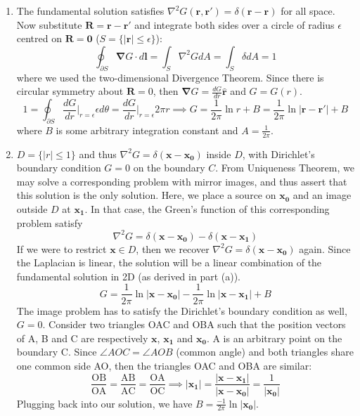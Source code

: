 \documentclass[a4paper]{article}
\begin{document}
\begin{ans}\leavevmode
\begin{enumerate}[label=(\alph*)]
\item The fundamental solution satisfies $\nabla^2G(\mathbf{r},\mathbf{r'})=\delta(\mathbf{r}-\mathbf{r})$ for all space. Now substitute $\mathbf{R}=\mathbf{r}-\mathbf{r'}$ and integrate both sides over a circle of radius $\epsilon$ centred on $\mathbf{R}=\boldsymbol{0}$ ($S=\{|\mathbf{r}|\leq\epsilon\}$):
$$\oint_{\partial S}\boldsymbol{\nabla}G\cdot d\mathbf{l}=\int_S\nabla^2GdA=\int_S\delta dA=1$$
where we used the two-dimensional Divergence Theorem. Since there is circular symmetry about $\mathbf{R}=0$, then $\boldsymbol{\nabla}G=\frac{dG}{dr}\mathbf{\hat{r}}$ and $G=G(r)$.
$$1=\oint_{\partial S}\frac{dG}{dr}\bigg|_{r=\epsilon}\epsilon d\theta=\frac{dG}{dr}\bigg|_{r=\epsilon}2\pi r\implies G=\frac{1}{2\pi}\ln r+B=\frac{1}{2\pi}\ln|\mathbf{r}-\mathbf{r'}|+B$$
where $B$ is some arbitrary integration constant and $A=\frac{1}{2\pi}$.
\item $D=\{|r|\leq 1\}$ and thus $\nabla^2G=\delta(\mathbf{x}-\mathbf{x_0})$ inside $D$, with Dirichlet's boundary condition $G=0$ on the boundary $C$. From Uniqueness Theorem, we may solve a corresponding problem with mirror images, and thus assert that this solution is the only solution. Here, we place a source on $\mathbf{x_0}$ and an image outside $D$ at $\mathbf{x_1}$. In that case, the Green's function of this corresponding problem satisfy
$$\nabla^2G=\delta(\mathbf{x}-\mathbf{x_0})-\delta(\mathbf{x}-\mathbf{x_1})$$
If we were to restrict $\mathbf{x}\in D$, then we recover $\nabla^2G=\delta(\mathbf{x}-\mathbf{x_0})$ again. Since the Laplacian is linear, the solution will be a linear combination of the fundamental solution in 2D (as derived in part (a)).
$$G=\frac{1}{2\pi}\ln|\mathbf{x}-\mathbf{x_0}|-\frac{1}{2\pi}\ln|\mathbf{x}-\mathbf{x_1}|+B$$
The image problem has to satisfy the Dirichlet's boundary condition as well, $G=0$.  Consider two triangles OAC and OBA such that the position vectors of A, B and C are respectively $\mathbf{x}$, $\mathbf{x_1}$ and $\mathbf{x_0}$. A is an arbitrary point on the boundary C. Since $\angle AOC=\angle AOB$ (common angle) and both triangles share one common side AO, then the triangles OAC and OBA are similar:
$$\frac{\text{OB}}{\text{OA}}=\frac{\text{AB}}{\text{AC}}=\frac{\text{OA}}{\text{OC}}\implies|\mathbf{x_1}|=\frac{|\mathbf{x}-\mathbf{x_1}|}{|\mathbf{x}-\mathbf{x_0}|}=\frac{1}{|\mathbf{x_0}|}$$
Plugging back into our solution, we have $B=\frac{-1}{2\pi}\ln|\mathbf{x_0}|$.

\end{enumerate}
\end{ans}
\end{document}
